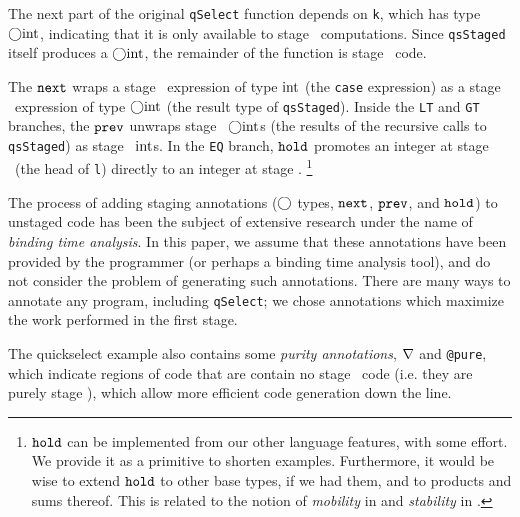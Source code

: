 \begin{abstrsyn}
The next part of the original \texttt{qSelect} function depends on \texttt{k},
which has type $\bigcirc{\rm int}$, indicating that it is only available to stage
\bbtwo\ computations. Since \texttt{qsStaged} itself produces a $\bigcirc{\rm int}$,
the remainder of the function is stage \bbtwo\ code.

The ${\tt next}$ wraps a stage \bbtwo\ expression of type ${\rm int}$ (the \texttt{case}
expression) as a stage \bbone\ expression of type $\bigcirc{\rm int}$ (the result type
of \texttt{qsStaged}). Inside the \texttt{LT} and \texttt{GT} branches, the
${\tt prev}$ unwraps stage \bbone\ $\bigcirc{\rm int}$s (the results of the recursive calls
to \texttt{qsStaged}) as stage \bbtwo\ ${\rm int}$s. In the \texttt{EQ} branch,
${\tt hold}$ promotes an integer at stage \bbone\ (the head of \texttt{l}) directly
to an integer at stage \bbtwo.%
\footnote{${\tt hold}$ can be implemented from our other language features, with
some effort. We provide it as a primitive to shorten examples. Furthermore, it
would be wise to extend ${\tt hold}$ to other base types, if we had them, and to
products and sums thereof.  This is related to the notion of {\em mobility} in
\cite{murphy05} and {\em stability} in \cite{krishnaswami13}.}

The process of adding staging annotations ($\bigcirc$ types, ${\tt next}$, ${\tt prev}$, and
${\tt hold}$) to unstaged code has been the subject of extensive research under the
name of \emph{binding time analysis}. In this paper, we assume that these
annotations have been provided by the programmer (or perhaps a binding time
analysis tool), and do not consider the problem of generating such annotations.
There are many ways to annotate any program, including \texttt{qSelect}; we
chose annotations which maximize the work performed in the first stage.




The quickselect example also contains some {\em purity annotations}, 
$\nabla$ and \texttt{@pure}, which indicate regions of code that are 
contain no stage \bbtwo\ code (i.e. they are purely stage \bbone),
which allow more efficient code generation down the line.


\end{abstrsyn}
